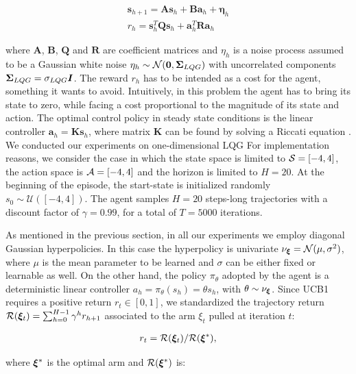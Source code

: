 \begin{align}
\boldsymbol{s}_{h+1}=\boldsymbol{A}\boldsymbol{s}_h+\boldsymbol{B}\boldsymbol{a}_h +\boldsymbol{\eta}_h\\
r_h=\boldsymbol{s}_{h}^T\boldsymbol{Q}\boldsymbol{s}_{h}+\boldsymbol{a}_{h}^T\boldsymbol{R}\boldsymbol{a}_{h}
\end{align}

where $\boldsymbol{A}$, $\boldsymbol{B}$, $\boldsymbol{Q}$ and $\boldsymbol{R}$ are coefficient matrices and $\eta_h$ is a noise process assumed to be a Gaussian white noise $\eta_h\sim\mathcal{N}(\boldsymbol{0}, \boldsymbol{\Sigma}_{LQG})$ with uncorrelated components $\boldsymbol{\Sigma}_{LQG}=\sigma_{LQG}\boldsymbol{I}$. The reward $r_h$ has to be intended as a cost for the agent, something it wants to avoid.
Intuitively, in this problem the agent has to bring its state to zero, while facing a cost proportional to the magnitude of its state and action. The optimal control policy in steady state conditions is the linear controller $\boldsymbol{a}_{h}=\boldsymbol{K}\boldsymbol{s}_{h}$, where matrix $\boldsymbol{K}$ can be found by solving a Riccati equation \cite{dorato1995linear}. 
We conducted our experiments on one-dimensional \gls{LQG}
For implementation reasons, we consider the case in which the state space is limited to $\mathcal{S}=[-4,4]$, the action space is $\mathcal{A}=[-4,4]$ and the horizon is limited to $H=20$. At the beginning of the episode, the start-state is initialized randomly $s_0\sim\mathcal{U}([-4,4])$. The agent samples $H=20$ steps-long trajectories with a discount factor of $\gamma=0.99$, for a total of $T=5000$ iterations.

As mentioned in the previous section, in all our experiments we employ diagonal Gaussian hyperpolicies. In this case the hyperpolicy is univariate $\nu_{\boldsymbol{\xi}} = \mathcal{N}(\mu, \sigma^2)$, where $\mu$ is the mean parameter to be learned and $\sigma$ can be either fixed or learnable as well. On the other hand, the policy $\pi_{\theta}$ adopted by the agent is a deterministic linear controller $a_h=\pi_{\theta}(s_h)=\theta s_h$, with $\theta\sim\nu_{\boldsymbol{\xi}}$. Since \gls{UCB}1 requires a positive return $r_t\in[0,1]$, we standardized the trajectory return $\mathcal{R}(\boldsymbol{\xi}_t)=\sum_{h=0}^{H-1}\gamma^h r_{h+1}$ associated to the arm $\xi_t$ pulled at iteration $t$: 

\begin{align}
r_t=\mathcal{R}(\boldsymbol{\xi}_t)/\mathcal{R}(\boldsymbol{\xi}^*),
\end{align}

where $\boldsymbol{\xi}^*$ is the optimal arm and $\mathcal{R}(\boldsymbol{\xi}^*)$ is:

